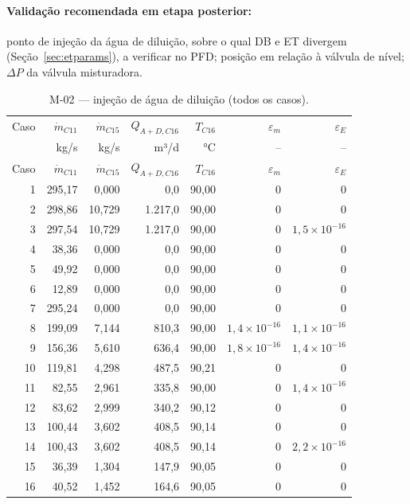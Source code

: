 \documentclass[11pt,a4paper]{article}
\numberwithin{equation}{section}
\numberwithin{table}{section}
\numberwithin{figure}{section}
\begin{document}
\paragraph{Validação recomendada em etapa posterior:} ponto de injeção da água de diluição, sobre o qual DB e ET divergem (Seção~\ref{sec:etparams}), a verificar no PFD; posição em relação à válvula de nível; $\Delta P$ da válvula misturadora.
{\footnotesize\setlength{\tabcolsep}{3.5pt}\begin{longtable}{rrrrrrr}
\caption{M-02 --- injeção de água de diluição (todos os casos).\label{tab:b09}}\\\toprule
Caso & $\dot m_{C11}$ & $\dot m_{C15}$ & $Q_{A+D,C16}$ & $T_{C16}$ & $\varepsilon_m$ & $\varepsilon_E$\\
 & kg/s & kg/s & m³/d & °C & -- & --\\\midrule\endfirsthead
\toprule Caso & $\dot m_{C11}$ & $\dot m_{C15}$ & $Q_{A+D,C16}$ & $T_{C16}$ & $\varepsilon_m$ & $\varepsilon_E$\\\midrule\endhead
1 & 295,17 & 0,000 & 0,0 & 90,00 & $0$ & $0$\\
2 & 298,86 & 10,729 & 1.217,0 & 90,00 & $0$ & $0$\\
3 & 297,54 & 10,729 & 1.217,0 & 90,00 & $0$ & $1{,}5\times10^{-16}$\\
4 & 38,36 & 0,000 & 0,0 & 90,00 & $0$ & $0$\\
5 & 49,92 & 0,000 & 0,0 & 90,00 & $0$ & $0$\\
6 & 12,89 & 0,000 & 0,0 & 90,00 & $0$ & $0$\\
7 & 295,24 & 0,000 & 0,0 & 90,00 & $0$ & $0$\\
8 & 199,09 & 7,144 & 810,3 & 90,00 & $1{,}4\times10^{-16}$ & $1{,}1\times10^{-16}$\\
9 & 156,36 & 5,610 & 636,4 & 90,00 & $1{,}8\times10^{-16}$ & $1{,}4\times10^{-16}$\\
10 & 119,81 & 4,298 & 487,5 & 90,21 & $0$ & $0$\\
11 & 82,55 & 2,961 & 335,8 & 90,00 & $0$ & $1{,}4\times10^{-16}$\\
12 & 83,62 & 2,999 & 340,2 & 90,12 & $0$ & $0$\\
13 & 100,44 & 3,602 & 408,5 & 90,14 & $0$ & $0$\\
14 & 100,43 & 3,602 & 408,5 & 90,14 & $0$ & $2{,}2\times10^{-16}$\\
15 & 36,39 & 1,304 & 147,9 & 90,05 & $0$ & $0$\\
16 & 40,52 & 1,452 & 164,6 & 90,05 & $0$ & $0$\\
\bottomrule\end{longtable}}
\end{document}
